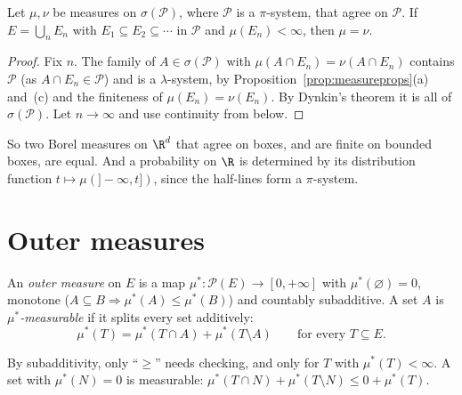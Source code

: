 \begin{theorem}\label{thm:uniq6}
Let $\mu,\nu$ be measures on $\sigma(\mathcal P)$, where $\mathcal P$ is a $\pi$-system, that agree on $\mathcal P$. If $E=\bigcup_nE_n$ with $E_1\subseteq E_2\subseteq\cdots$ in $\mathcal P$ and $\mu(E_n)<\infty$,
then $\mu=\nu$.
\end{theorem}
\begin{proof}
Fix $n$. The family of $A\in\sigma(\mathcal P)$ with $\mu(A\cap E_n)=\nu(A\cap E_n)$ contains $\mathcal P$ (as $A\cap E_n\in\mathcal P$) and is a $\lambda$-system, by Proposition~\ref{prop:measureprops}(a) and~(c) and the
finiteness of $\mu(E_n)=\nu(E_n)$. By Dynkin's theorem it is all of $\sigma(\mathcal P)$. Let $n\to\infty$ and use continuity from below.
\end{proof}

So two Borel measures on $\R^d$ that agree on boxes, and are finite on bounded boxes, are equal. And a probability on $\R$ is determined
by its distribution function $t\mapsto\mu(]-\infty,t])$, since the half-lines form a $\pi$-system.

\section{Outer measures}

\begin{definition}
An \emph{outer measure} on $E$ is a map $\mu^*:\mathcal P(E)\to[0,+\infty]$ with $\mu^*(\varnothing)=0$, monotone ($A\subseteq B\Rightarrow\mu^*(A)\le\mu^*(B)$) and countably subadditive. A set $A$
is \emph{$\mu^*$-measurable} if it splits every set additively:
\[\mu^*(T)=\mu^*(T\cap A)+\mu^*(T\setminus A)\qquad\text{for every }T\subseteq E.\]
\end{definition}

By subadditivity, only ``$\ge$'' needs checking, and only for $T$ with $\mu^*(T)<\infty$. A set with $\mu^*(N)=0$ is measurable:
$\mu^*(T\cap N)+\mu^*(T\setminus N)\le0+\mu^*(T)$.

